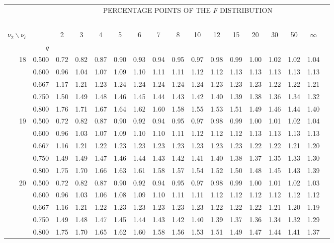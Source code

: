 {\begin{center}
\begin{tabular}{rrr@{\,}r@{\,}r@{\,}r@{\,}r@{\,}r@{\,}r@{\,}r
                   @{\,}r@{\,}r@{\,}r@{\,}r@{\,}r@{\,}r@{\,}r}
&&\multicolumn{14}{c}{PERCENTAGE POINTS OF THE $F$ DISTRIBUTION}\\
\ \\
$\nu_2\backslash\nu_l$ & & 
\multicolumn{1}{c}{2} &\multicolumn{1}{c}{3} &
\multicolumn{1}{c}{4} &\multicolumn{1}{c}{5} &
\multicolumn{1}{c}{6} &\multicolumn{1}{c}{7} &
\multicolumn{1}{c}{8} &\multicolumn{1}{c}{10}&
\multicolumn{1}{c}{12}&\multicolumn{1}{c}{15}&
\multicolumn{1}{c}{20}&\multicolumn{1}{c}{30}&
\multicolumn{1}{c}{50}&\multicolumn{1}{c}{$\infty$}\\
& $q$ \\
18&0.500&0.72&0.82&0.87&0.90&0.93&0.94&0.95&0.97&0.98&0.99&1.00&1.02&1.02&1.04\\
  &0.600&0.96&1.04&1.07&1.09&1.10&1.11&1.11&1.12&1.12&1.13&1.13&1.13&1.13&1.13\\
  &0.667&1.17&1.21&1.23&1.24&1.24&1.24&1.24&1.24&1.23&1.23&1.23&1.22&1.22&1.21\\
  &0.750&1.50&1.49&1.48&1.46&1.45&1.44&1.43&1.42&1.40&1.39&1.38&1.36&1.34&1.32\\
  &0.800&1.76&1.71&1.67&1.64&1.62&1.60&1.58&1.55&1.53&1.51&1.49&1.46&1.44&1.40\\
19&0.500&0.72&0.82&0.87&0.90&0.92&0.94&0.95&0.97&0.98&0.99&1.00&1.01&1.02&1.04\\
  &0.600&0.96&1.03&1.07&1.09&1.10&1.10&1.11&1.12&1.12&1.12&1.13&1.13&1.13&1.13\\
  &0.667&1.16&1.21&1.22&1.23&1.23&1.23&1.23&1.23&1.23&1.23&1.22&1.22&1.21&1.20\\
  &0.750&1.49&1.49&1.47&1.46&1.44&1.43&1.42&1.41&1.40&1.38&1.37&1.35&1.33&1.30\\
  &0.800&1.75&1.70&1.66&1.63&1.61&1.58&1.57&1.54&1.52&1.50&1.48&1.45&1.43&1.39\\
20&0.500&0.72&0.82&0.87&0.90&0.92&0.94&0.95&0.97&0.98&0.99&1.00&1.01&1.02&1.03\\
  &0.600&0.96&1.03&1.06&1.08&1.09&1.10&1.11&1.11&1.12&1.12&1.12&1.12&1.12&1.12\\
  &0.667&1.16&1.21&1.22&1.23&1.23&1.23&1.23&1.23&1.22&1.22&1.22&1.21&1.20&1.19\\
  &0.750&1.49&1.48&1.47&1.45&1.44&1.43&1.42&1.40&1.39&1.37&1.36&1.34&1.32&1.29\\
  &0.800&1.75&1.70&1.65&1.62&1.60&1.58&1.56&1.53&1.51&1.49&1.47&1.44&1.41&1.37\\

\end{tabular}
\end{center}}
